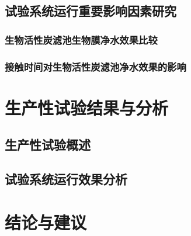 \subsection{试验系统运行重要影响因素研究}
\subsubsection{生物活性炭滤池生物膜净水效果比较}
\lipsum
\subsubsection{接触时间对生物活性炭滤池净水效果的影响}
\lipsum
{\centering\section{生产性试验结果与分析}}
\subsection{生产性试验概述}
\lipsum
\subsection{试验系统运行效果分析}
\lipsum
{\centering\section{结论与建议}}
